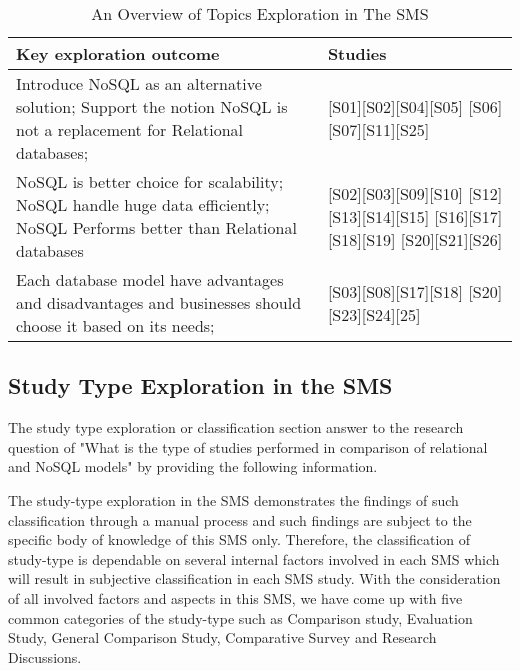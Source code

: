 \documentclass[sigconf,nonacm]{acmart}
\begin{document}
\begin{table}[H]
  \caption{An Overview of Topics Exploration in The SMS}
  \label{tab:freq}
  \begin{tabular}{ |p{3cm}|p{3cm}|}
    \toprule
    Key exploration outcome & Studies\\
    \midrule
     Introduce NoSQL as an alternative solution;\newline
     Support the notion NoSQL is not a replacement for Relational databases;  &
       [S01][S02][S04][S05] [S06][S07][S11][S25]\\
    \midrule
     NoSQL is better choice for scalability;\newline 
     NoSQL handle huge data efficiently;\newline
     NoSQL Performs better than Relational databases & [S02][S03][S09][S10] [S12][S13][S14][S15]
      [S16][S17][S18][S19] [S20][S21][S26]\\
    \midrule 
     Each database model have advantages and disadvantages and
     businesses should choose it based on its needs;
      &[S03][S08][S17][S18] [S20][S23][S24][25]\\
  \bottomrule
\end{tabular}
\end{table}

\subsection{Study Type Exploration in the SMS}
The study type exploration or classification section answer to the research question of "What is the type of studies performed in comparison of  relational and NoSQL models" by providing the following information.

The study-type exploration in the SMS demonstrates the findings of such classification through a manual process and such findings are subject to the specific body of knowledge of this SMS only. Therefore, the classification of study-type is dependable on several internal factors involved in each SMS which will result in subjective classification in each SMS study. With the consideration of all involved factors and aspects in this SMS, we have come up with five common categories of the study-type such as Comparison study, Evaluation Study, General Comparison Study, Comparative Survey and Research Discussions.
\end{document}
